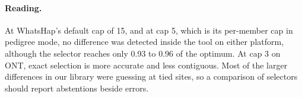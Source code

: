 \paragraph{Reading.} At WhatsHap's default cap of 15, and at cap 5, which is
its per-member cap in pedigree mode, no difference was detected inside the
tool on either platform, although the selector reaches only 0.93 to 0.96 of
the optimum. At cap 3 on ONT, exact selection is more accurate and less
contiguous. Most of the larger differences in our library were guessing at
tied sites, so a comparison of selectors should report abstentions beside
errors.
